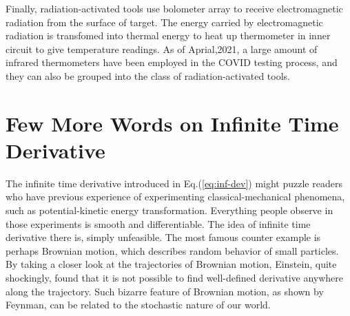 Finally, radiation-activated tools use bolometer array to receive electromagnetic radiation from the surface of target. The energy carried by electromagnetic radiation is transfomed into thermal energy to heat up thermometer in inner circuit to give temperature readings. As of Aprial,2021, a large amount of infrared thermometers have been employed in the COVID testing process, and they can also be grouped into the class of radiation-activated tools.

\section{Few More Words on Infinite Time Derivative}
The infinite time derivative introduced in Eq.(\ref{eq:inf-dev}) might puzzle readers who have previous experience of experimenting classical-mechanical phenomena, such as potential-kinetic energy transformation. Everything people observe in those experiments is smooth and differentiable. The idea of infinite time derivative there is, simply unfeasible. The most famous counter example is perhaps Brownian motion, which describes random behavior of small particles. By taking a closer look at the trajectories of Brownian motion, Einstein, quite shockingly, found that it is not possible to find well-defined derivative anywhere along the trajectory. Such bizarre feature of Brownian motion, as shown by Feynman\cite{feynman2010quantum}, can be related to the stochastic nature of our world.